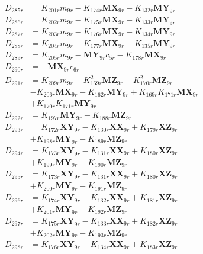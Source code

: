 \begin{multicols}{2}
\begin{align}
D_{285r} &= K_{201r}m_{9r} - K_{174r}\mathbf{MX}_{9r} - K_{132r}\mathbf{MY}_{9r} \nonumber \\
D_{286r} &= K_{202r}m_{9r} - K_{175r}\mathbf{MX}_{9r} - K_{133r}\mathbf{MY}_{9r} \nonumber \\
D_{287r} &= K_{203r}m_{9r} - K_{176r}\mathbf{MX}_{9r} - K_{134r}\mathbf{MY}_{9r} \nonumber \\
D_{288r} &= K_{204r}m_{9r} - K_{177r}\mathbf{MX}_{9r} - K_{135r}\mathbf{MY}_{9r} \nonumber \\
D_{289r} &= K_{205r}m_{9r} - \mathbf{MY}_{9r}c_{5r} - K_{178r}\mathbf{MX}_{9r} \nonumber \\
D_{290r} &= -\mathbf{MX}_{9r}c_{6r} \nonumber \\
D_{291r} &= K_{209r}m_{9r} - K_{169r}^2\mathbf{MZ}_{9r} - K_{170r}^2\mathbf{MZ}_{9r}  \nonumber \\
&- K_{206r}\mathbf{MX}_{9r} - K_{162r}\mathbf{MY}_{9r} + K_{169r}K_{171r}\mathbf{MX}_{9r}  \nonumber \\
&+ K_{170r}K_{171r}\mathbf{MY}_{9r} \nonumber \\
D_{292r} &= K_{197r}\mathbf{MY}_{9r} - K_{188r}\mathbf{MZ}_{9r} \nonumber \\
D_{293r} &= K_{172r}\mathbf{XY}_{9r} - K_{130r}\mathbf{XX}_{9r} + K_{179r}\mathbf{XZ}_{9r}  \nonumber \\
&+ K_{198r}\mathbf{MY}_{9r} - K_{189r}\mathbf{MZ}_{9r} \nonumber \\
D_{294r} &= K_{173r}\mathbf{XY}_{9r} - K_{131r}\mathbf{XX}_{9r} + K_{180r}\mathbf{XZ}_{9r}  \nonumber \\
&+ K_{199r}\mathbf{MY}_{9r} - K_{190r}\mathbf{MZ}_{9r} \nonumber \\
D_{295r} &= K_{173r}\mathbf{XY}_{9r} - K_{131r}\mathbf{XX}_{9r} + K_{180r}\mathbf{XZ}_{9r}  \nonumber \\
&+ K_{200r}\mathbf{MY}_{9r} - K_{191r}\mathbf{MZ}_{9r} \nonumber \\
D_{296r} &= K_{174r}\mathbf{XY}_{9r} - K_{132r}\mathbf{XX}_{9r} + K_{181r}\mathbf{XZ}_{9r}  \nonumber \\
&+ K_{201r}\mathbf{MY}_{9r} - K_{192r}\mathbf{MZ}_{9r} \nonumber \\
D_{297r} &= K_{175r}\mathbf{XY}_{9r} - K_{133r}\mathbf{XX}_{9r} + K_{182r}\mathbf{XZ}_{9r}  \nonumber \\
&+ K_{202r}\mathbf{MY}_{9r} - K_{193r}\mathbf{MZ}_{9r} \nonumber \\
D_{298r} &= K_{176r}\mathbf{XY}_{9r} - K_{134r}\mathbf{XX}_{9r} + K_{183r}\mathbf{XZ}_{9r}  \nonumber \\

\end{align}
\end{multicols}
